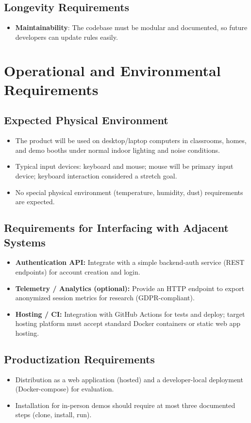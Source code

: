 \documentclass[12pt]{article}
\begin{document}
\subsection{Longevity Requirements}
	\begin{itemize}
		\item\textbf{Maintainability}: The codebase must be modular and documented, so future developers can update rules easily.
	\end{itemize}

\section{Operational and Environmental Requirements}

\subsection{Expected Physical Environment}
\begin{itemize}
  \item The product will be used on desktop/laptop computers in classrooms, homes, and demo booths under normal indoor lighting and noise conditions.
  \item Typical input devices: keyboard and mouse; mouse will be primary input device; keyboard interaction considered a stretch goal.
  \item No special physical environment (temperature, humidity, dust) requirements are expected.
\end{itemize}

\subsection{Requirements for Interfacing with Adjacent Systems}
\begin{itemize}
  \item \textbf{Authentication API:} Integrate with a simple backend-auth service (REST endpoints) for account creation and login.
  \item \textbf{Telemetry / Analytics (optional):} Provide an HTTP endpoint to export anonymized session metrics for research (GDPR-compliant).
  \item \textbf{Hosting / CI:} Integration with GitHub Actions for tests and deploy; target hosting platform must accept standard Docker containers or static web app hosting.
\end{itemize}

\subsection{Productization Requirements}
\begin{itemize}
  \item Distribution as a web application (hosted) and a developer-local deployment (Docker-compose) for evaluation.
  \item Installation for in-person demos should require at most three documented steps (clone, install, run).
\end{itemize}
\end{document}
